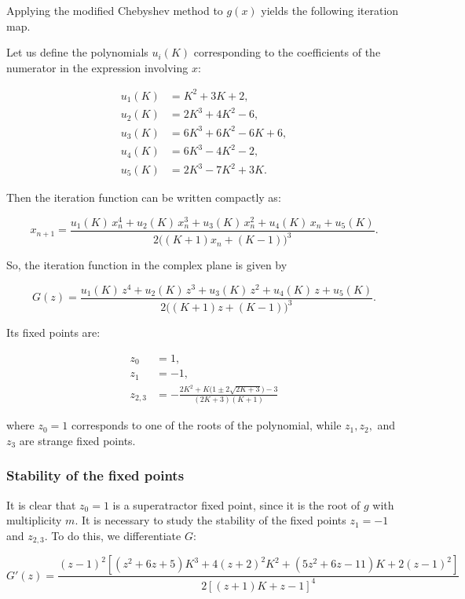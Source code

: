 \documentclass{article}
\theoremstyle{definition}
\theoremstyle{remark}
\begin{document}
Applying the modified Chebyshev method to \( g(x) \) yields the following iteration map.

Let us define the polynomials \( u_i(K) \) corresponding to the coefficients of the numerator in the expression involving \( x \):

\[
\begin{aligned}
	u_1(K) &= K^2 + 3K + 2, \\
	u_2(K) &= 2K^3 + 4K^2 - 6, \\
	u_3(K) &= 6K^3 + 6K^2 - 6K + 6, \\
	u_4(K) &= 6K^3 - 4K^2 - 2, \\
	u_5(K) &= 2K^3 - 7K^2 + 3K .
\end{aligned}
\]

Then the iteration function can be written compactly as:

\[
x_{n+1}=\frac{u_1(K) \, x_{n}^4 + u_2(K) \, x_{n}^3 + u_3(K) \, x_{n}^2 + u_4(K) \, x_{n} + u_5(K)}
{2\big( (K+1)x_{n} + (K-1) \big)^3 } .
\]

So, the iteration function in the complex plane is given by

\[
G(z)=\frac{u_1(K) \, z^4 + u_2(K) \, z^3 + u_3(K) \, z^2 + u_4(K) \, z + u_5(K)}
{2\big( (K+1)z + (K-1) \big)^3 } .
\]

Its fixed points are:

\[
\begin{aligned}
	z_{0} &= 1, \\[4pt]
	z_{1} &= -1, \\[-4pt]
	z_{2,3} &= -\frac{2K^{2} + K\bigl(1 \pm 2\sqrt{2K+3}\bigr) - 3}
	{(2K+3)(K+1)}
\end{aligned}
\]

where \( z_0 = 1 \) corresponds to one of the roots of the polynomial, while \( z_1, z_2, \) and \( z_3 \) are strange fixed points.

\subsubsection{Stability of the fixed points}


It is clear that $z_0 = 1$ is a superatractor fixed point, since it is the root of $g$ with multiplicity $m$. It is necessary to study the stability of the fixed points $z_1 = -1$ and $z_{2,3}$. To do this, we differentiate $G$:

\begin{equation}
	G'(z) = \frac{(z -1)^{2} [(z^{2}+6z+5) K^{3}+4 (z+2)^{2} K^{2}+(5z^{2}+6z-11) K +2 (z-1)^{2}]}{2 [(z+1) K +z-1]^{4}}
\end{equation}
\end{document}
